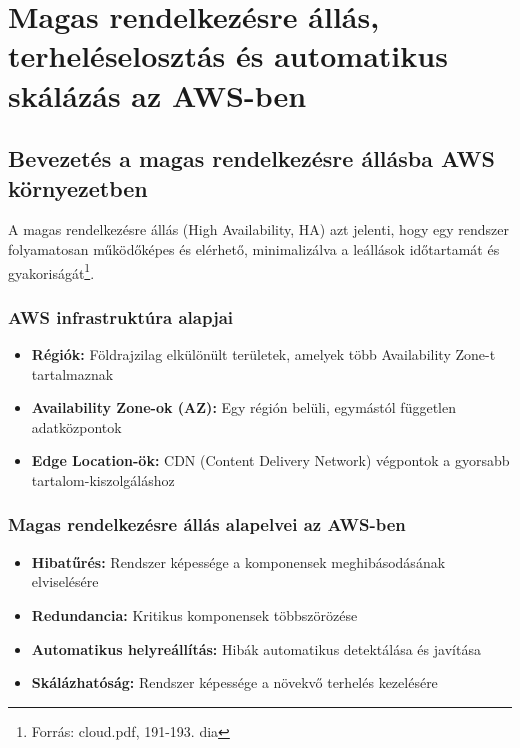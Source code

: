 \documentclass[a4paper,12pt]{article}
\begin{document}
    \newpage


    \section{Magas rendelkezésre állás, terheléselosztás és automatikus skálázás az AWS-ben}

    \subsection{Bevezetés a magas rendelkezésre állásba AWS környezetben}

    A magas rendelkezésre állás (High Availability, HA) azt jelenti, hogy egy rendszer folyamatosan működőképes és elérhető, minimalizálva a leállások időtartamát és gyakoriságát\footnote{Forrás: cloud.pdf, 191-193. dia}.

    \subsubsection{AWS infrastruktúra alapjai}

    \begin{itemize}
        \item \textbf{Régiók:} Földrajzilag elkülönült területek, amelyek több Availability Zone-t tartalmaznak
        \item \textbf{Availability Zone-ok (AZ):} Egy régión belüli, egymástól független adatközpontok
        \item \textbf{Edge Location-ök:} CDN (Content Delivery Network) végpontok a gyorsabb tartalom-kiszolgáláshoz
    \end{itemize}

    \subsubsection{Magas rendelkezésre állás alapelvei az AWS-ben}

    \begin{itemize}
        \item \textbf{Hibatűrés:} Rendszer képessége a komponensek meghibásodásának elviselésére
        \item \textbf{Redundancia:} Kritikus komponensek többszörözése
        \item \textbf{Automatikus helyreállítás:} Hibák automatikus detektálása és javítása
        \item \textbf{Skálázhatóság:} Rendszer képessége a növekvő terhelés kezelésére
    \end{itemize}
\end{document}
